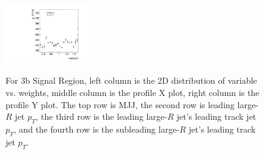 \begin{figure}[htbp!]
\begin{center}
\includegraphics[angle=270, width=0.32\textwidth]{./figures/boosted/AppendixReweight/Weights/3Trk_Signal_sublHCand_trk0_Pt_weight_profy.pdf}\\
\caption{For 3b Signal Region, left column is the 2D distribution of variable vs. weights, middle column is the profile X plot, right column is the profile Y plot. The top row is MJJ, the second row is leading large-$R$ jet $p_{T}$, the third row is the leading large-$R$ jet's leading track jet $p_{T}$, and the fourth row is the subleading large-$R$ jet's leading track jet $p_{T}$.}
\label{fig:app-reweight-dist-3b-SR}
\end{center}
\end{figure}


